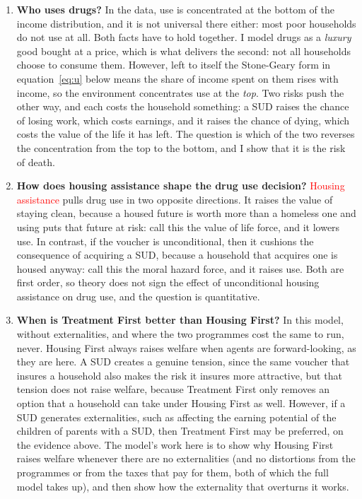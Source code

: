 \documentclass[10pt]{article}
\begin{document}
\begin{enumerate}\setlength{\itemsep}{0.3em}\setlength{\parskip}{0em}

\item \textbf{Who uses drugs?} In the data, use is concentrated at the bottom of
the income distribution, and it is not universal there either: most poor households
do not use at all. Both facts have to hold together. I model drugs as a
\emph{luxury} good bought at a price, which is what delivers the second: not
all households choose to consume them. However, left to itself the Stone-Geary form in equation~\eqref{eq:u} below means the share of
income spent on them rises with income, so the environment
concentrates use at the \emph{top}. Two risks push the other way, and each
costs the household something: a SUD raises the chance of losing work, which
costs earnings, and it raises the chance of dying, which costs the value of the life
it has left. The question is which of the two reverses the concentration from the top
to the bottom, and I show that it is the risk of death.

\item \textbf{How does housing assistance shape the drug use decision?} \textcolor{red}{Housing
assistance} pulls drug use in two opposite directions. It raises the value of
staying clean, because a housed future is worth more than a homeless one and
using puts that future at risk: call this the value of life force, and it lowers
use. In contrast, if the voucher is unconditional, then it cushions the consequence of acquiring a SUD, because
a household that acquires one is housed anyway: call this the moral hazard
force, and it raises use. Both are first order, so theory does not sign the
effect of unconditional housing assistance on drug use, and the question is quantitative.

\item \textbf{When is Treatment First better than Housing First?} In this model, without externalities, and where the two programmes cost the same to
run, never. Housing First always raises welfare when agents
are forward-looking, as they are here. A SUD creates a genuine tension,
since the same voucher that insures a household also makes the risk it insures
more attractive, but that tension does not raise welfare, because Treatment
First only removes an option that a household can take under Housing First as
well. However, if a SUD generates externalities, such
as affecting the earning potential of the children of parents with a SUD, then
Treatment First may be preferred, on the evidence above. The
model's work here is to show why Housing First raises welfare whenever
there are no externalities (and no distortions from the programmes or
from the taxes that pay for them, both of which the full model takes up),
and then show how the externality that overturns it works.

\end{enumerate}
\end{document}
